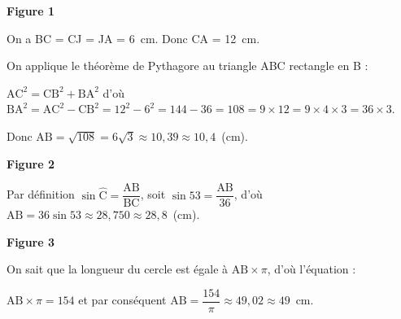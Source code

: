 
\medskip

\textbf{Figure 1}

On a BC = CJ = JA = 6~cm. Donc CA = 12~cm.

On applique le théorème de Pythagore au triangle ABC rectangle en B :

$\text{AC}^2 = \text{CB}^2 + \text{BA}^2$ d'où $\text{BA}^2 = \text{AC}^2 - \text{CB}^2 = 12^2 - 6^2  = 144 - 36 = 108 = 9 \times 12 = 9 \times 4 \times 3 = 36 \times 3$.

Donc $\text{AB} = \sqrt{108} = 6\sqrt{3} \approx 10,39\approx 10,4$~(cm).

\textbf{Figure 2}

Par définition $\sin \widehat{\text{C}} = \dfrac{\text{AB}}{\text{BC}}$, soit $\sin 53= \dfrac{\text{AB}}{36}$, d'où $\text{AB} = 36 \sin 53 \approx 28,750 \approx 28,8$~(cm).

\textbf{Figure 3}

On sait que la longueur du cercle est égale à $\text{AB} \times \pi$, d'où l'équation :

$\text{AB} \times \pi = 154$ et par conséquent $\text{AB} = \dfrac{154}{\pi} \approx 49,02 \approx 49$~cm.

\bigskip


